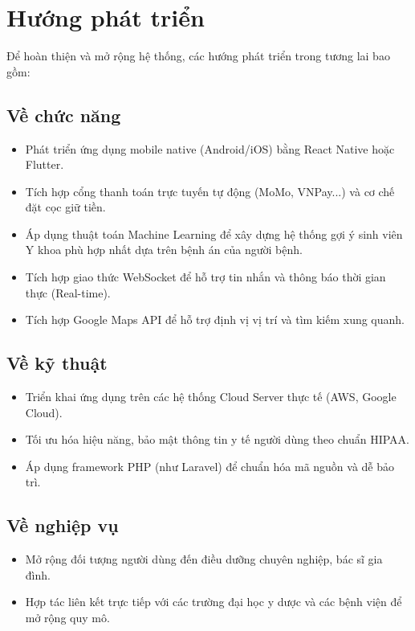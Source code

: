 \documentclass[a4paper,13pt]{extreport}
\begin{document}
\section{Hướng phát triển}

Để hoàn thiện và mở rộng hệ thống, các hướng phát triển trong tương lai bao gồm:

\subsection{Về chức năng}
\begin{itemize}
    \item Phát triển ứng dụng mobile native (Android/iOS) bằng React Native hoặc Flutter.
    \item Tích hợp cổng thanh toán trực tuyến tự động (MoMo, VNPay...) và cơ chế đặt cọc giữ tiền.
    \item Áp dụng thuật toán Machine Learning để xây dựng hệ thống gợi ý sinh viên Y khoa phù hợp nhất dựa trên bệnh án của người bệnh.
    \item Tích hợp giao thức WebSocket để hỗ trợ tin nhắn và thông báo thời gian thực (Real-time).
    \item Tích hợp Google Maps API để hỗ trợ định vị vị trí và tìm kiếm xung quanh.
\end{itemize}

\subsection{Về kỹ thuật}
\begin{itemize}
    \item Triển khai ứng dụng trên các hệ thống Cloud Server thực tế (AWS, Google Cloud).
    \item Tối ưu hóa hiệu năng, bảo mật thông tin y tế người dùng theo chuẩn HIPAA.
    \item Áp dụng framework PHP (như Laravel) để chuẩn hóa mã nguồn và dễ bảo trì.
\end{itemize}

\subsection{Về nghiệp vụ}
\begin{itemize}
    \item Mở rộng đối tượng người dùng đến điều dưỡng chuyên nghiệp, bác sĩ gia đình.
    \item Hợp tác liên kết trực tiếp với các trường đại học y dược và các bệnh viện để mở rộng quy mô.
\end{itemize}
\end{document}
